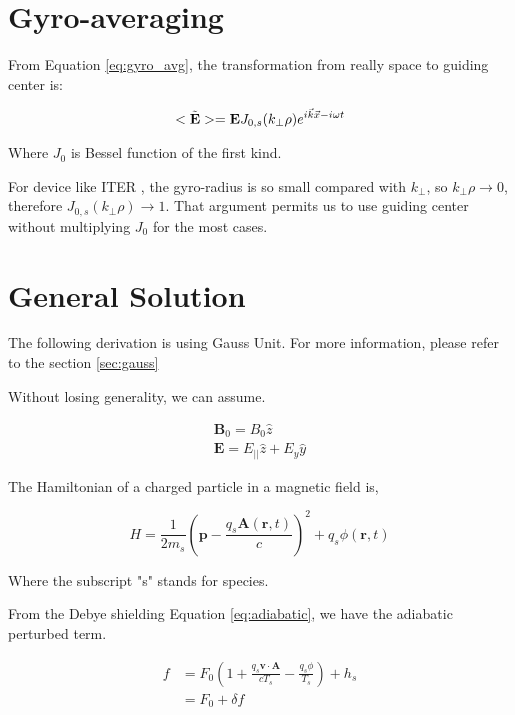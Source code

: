 \section{Gyro-averaging}

From Equation \ref{eq:gyro_avg}, the transformation from really space to guiding center is: 

\begin{equation}
    <\Tilde{\textbf{E}}>= \textbf{E} J_{0,s}(k_{\perp}\rho )e^{i\Vec{k}\Vec{x}-i\omega t}
\end{equation}

Where $J_0$ is Bessel function of the first kind. 

For device like ITER \cite{iter_scale}, the gyro-radius is so small compared with $k_{\perp}$, so $k_{\perp} \rho \rightarrow 0$, therefore $J_{0,s}(k_{\perp}\rho )\rightarrow 1$. That argument permits us to use guiding center without multiplying $J_0$ for the most cases.

\section{General Solution}

The following derivation is using Gauss Unit. For more information, please refer to the section \ref{sec:gauss}

Without losing generality, we can assume.

\begin{eqnarray}
    \textbf{B}_0=B_0\hat{z}\\
    \textbf{E}=E_{||}\hat{z}+E_y\hat{y}
\end{eqnarray}

The Hamiltonian of a charged particle in a magnetic field is,

\begin{equation}
H=\frac{1}{2 m_s}(\textbf{p}- \frac{q_s\textbf{A}(\textbf{r}, t)}{c})^{2}+q_s \phi(\textbf{r}, t)
\end{equation}

Where the subscript "s" stands for species.

From the Debye shielding Equation \ref{eq:adiabatic}, we have the adiabatic perturbed term. 

\begin{equation}
\begin{aligned}
    f{}&=F_0\left(1+\frac{q_s\textbf{v}\cdot \textbf{A}}{cT_s}-\frac{q_s\phi}{T_s} \right)+h_s\\
    &=F_0+\delta f
\end{aligned}
\end{equation}

